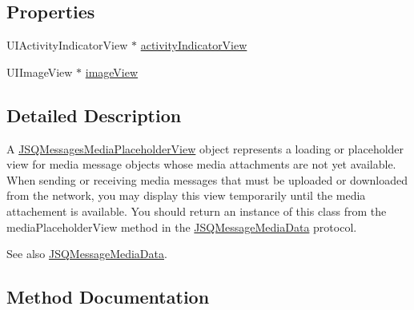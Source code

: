 \subsection*{Properties}
\begin{DoxyCompactItemize}
\item 
U\+I\+Activity\+Indicator\+View $\ast$ \hyperlink{interface_j_s_q_messages_media_placeholder_view_a2bc45f10ad60ccc9d6ac22c13e0f60b9}{activity\+Indicator\+View}
\item 
U\+I\+Image\+View $\ast$ \hyperlink{interface_j_s_q_messages_media_placeholder_view_a61790e167dfc9a5a9f96bd2d8d460ddf}{image\+View}
\end{DoxyCompactItemize}


\subsection{Detailed Description}
A {\ttfamily \hyperlink{interface_j_s_q_messages_media_placeholder_view}{J\+S\+Q\+Messages\+Media\+Placeholder\+View}} object represents a loading or placeholder view for media message objects whose media attachments are not yet available. When sending or receiving media messages that must be uploaded or downloaded from the network, you may display this view temporarily until the media attachement is available. You should return an instance of this class from the {\ttfamily media\+Placeholder\+View} method in the {\ttfamily \hyperlink{protocol_j_s_q_message_media_data-p}{J\+S\+Q\+Message\+Media\+Data}} protocol.

\begin{DoxySeeAlso}{See also}
\hyperlink{protocol_j_s_q_message_media_data-p}{J\+S\+Q\+Message\+Media\+Data}. 
\end{DoxySeeAlso}


\subsection{Method Documentation}
\hypertarget{interface_j_s_q_messages_media_placeholder_view_aa66725e24712154dd4bf23cb8f6a5665}{}
